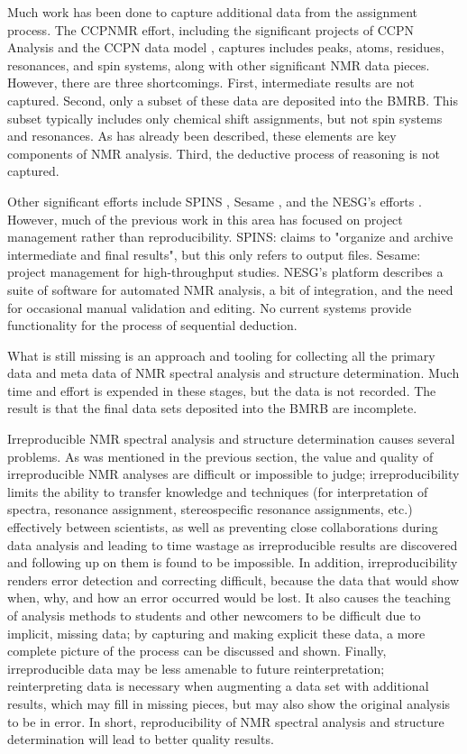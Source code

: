 \documentclass[a4paper]{report}
\begin{document}
Much work has been done to capture additional data from the assignment process.  
The CCPNMR effort, including the significant projects of CCPN Analysis and the 
CCPN data model \cite{ccpn}, captures includes peaks, atoms, residues, 
resonances, and spin systems, along with other significant NMR data pieces.  
However, there are three shortcomings.  First, intermediate results are not 
captured.  Second, only a subset of these data are deposited into the BMRB.  
This subset typically includes only chemical shift assignments, but not spin 
systems and resonances.   As has already been described, these elements are 
key components of NMR analysis.  Third, the deductive process of reasoning 
is not captured.

Other significant efforts include SPINS \cite{baran2006spins}, 
Sesame \cite{sesame}, and 
the NESG’s efforts \cite{nesg2005nmr}.  However, much of the previous 
work in this area has focused on project management rather than reproducibility.
SPINS: claims to "organize and archive intermediate and final results", but 
this only refers to output files.  Sesame:  project management for 
high-throughput studies.  NESG’s platform describes a suite of software for 
automated NMR analysis, a bit of integration, and the need for occasional 
manual validation and editing.  No current systems provide functionality for 
the process of sequential deduction.

What is still missing is an approach and tooling for collecting all the primary 
data and meta data of NMR spectral analysis and structure determination.  Much 
time and effort is expended in these stages, but the data is not recorded.  The 
result is that the final data sets deposited into the BMRB are incomplete.

Irreproducible NMR spectral analysis and structure determination causes 
several problems.  As was mentioned in the previous section, the value and 
quality of irreproducible NMR analyses are difficult or impossible to judge; 
irreproducibility limits the ability to transfer knowledge and techniques 
(for interpretation of spectra, resonance assignment, stereospecific resonance 
assignments, etc.) effectively between scientists, as well as preventing close 
collaborations during data analysis and leading to time wastage as 
irreproducible results are discovered and following up on them is found to be 
impossible.  In addition, irreproducibility renders error detection and 
correcting difficult, because the data that would show when, why, and how an 
error occurred would be lost.  It also causes the teaching of analysis methods 
to students and other newcomers to be difficult due to implicit, missing data; 
by capturing and making explicit these data, a more complete picture of the 
process can be discussed and shown.  Finally, irreproducible data may be less 
amenable to future reinterpretation; reinterpreting data is necessary when 
augmenting a data set with additional results, which may fill in missing 
pieces, but may also show the original analysis to be in error.  In short, 
reproducibility of NMR spectral analysis and structure determination will lead 
to better quality results.
\end{document}
